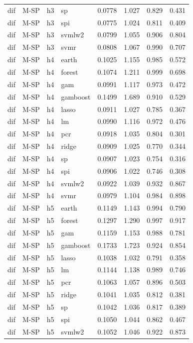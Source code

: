 \begin{ThreePartTable}
\begin{longtable}[t]{llclcccc}
dif & M-SP & h3 & sp & 0.0778 & 1.027 & 0.829 & 0.431\\
dif & M-SP & h3 & spi & 0.0775 & 1.024 & 0.811 & 0.409\\
dif & M-SP & h3 & svmlw2 & 0.0799 & 1.055 & 0.906 & 0.804\\
dif & M-SP & h3 & svmr & 0.0808 & 1.067 & 0.990 & 0.707\\
\addlinespace
dif & M-SP & h4 & earth & 0.1025 & 1.155 & 0.985 & 0.572\\
dif & M-SP & h4 & forest & 0.1074 & 1.211 & 0.999 & 0.698\\
dif & M-SP & h4 & gam & 0.0991 & 1.117 & 0.973 & 0.472\\
dif & M-SP & h4 & gamboost & 0.1499 & 1.689 & 0.910 & 0.529\\
dif & M-SP & h4 & lasso & 0.0911 & 1.027 & 0.785 & 0.367\\
dif & M-SP & h4 & lm & 0.0990 & 1.116 & 0.972 & 0.476\\
dif & M-SP & h4 & pcr & 0.0918 & 1.035 & 0.804 & 0.301\\
dif & M-SP & h4 & ridge & 0.0909 & 1.025 & 0.770 & 0.344\\
dif & M-SP & h4 & sp & 0.0907 & 1.023 & 0.754 & 0.316\\
dif & M-SP & h4 & spi & 0.0906 & 1.022 & 0.746 & 0.308\\
dif & M-SP & h4 & svmlw2 & 0.0922 & 1.039 & 0.932 & 0.867\\
dif & M-SP & h4 & svmr & 0.0979 & 1.104 & 0.984 & 0.898\\
\addlinespace
dif & M-SP & h5 & earth & 0.1149 & 1.143 & 0.994 & 0.790\\
dif & M-SP & h5 & forest & 0.1297 & 1.290 & 0.997 & 0.917\\
dif & M-SP & h5 & gam & 0.1159 & 1.153 & 0.988 & 0.781\\
dif & M-SP & h5 & gamboost & 0.1733 & 1.723 & 0.924 & 0.854\\
dif & M-SP & h5 & lasso & 0.1038 & 1.032 & 0.791 & 0.358\\
dif & M-SP & h5 & lm & 0.1144 & 1.138 & 0.989 & 0.746\\
dif & M-SP & h5 & pcr & 0.1063 & 1.057 & 0.896 & 0.503\\
dif & M-SP & h5 & ridge & 0.1041 & 1.035 & 0.812 & 0.381\\
dif & M-SP & h5 & sp & 0.1042 & 1.036 & 0.817 & 0.389\\
dif & M-SP & h5 & spi & 0.1050 & 1.044 & 0.862 & 0.467\\
dif & M-SP & h5 & svmlw2 & 0.1052 & 1.046 & 0.922 & 0.873\\

\end{longtable}
\end{ThreePartTable}
